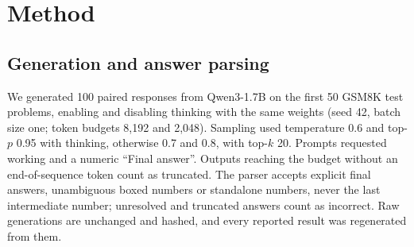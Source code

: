 \section{Method}\label{sec:method}

\subsection{Generation and answer parsing}\label{sec:method-gen}
We generated 100 paired responses from Qwen3-1.7B on the first 50 GSM8K test problems,
enabling and disabling thinking with the same weights (seed 42, batch size one; token
budgets 8,192 and 2,048). Sampling used temperature 0.6 and top-$p$ 0.95 with thinking,
otherwise 0.7 and 0.8, with top-$k$ 20. Prompts requested working and a numeric
``Final answer''. Outputs reaching the budget without an end-of-sequence token count as
truncated. The parser accepts explicit final answers, unambiguous boxed numbers or
standalone numbers, never the last intermediate number; unresolved and truncated
answers count as incorrect. Raw generations are unchanged and hashed, and every
reported result was regenerated from them.

